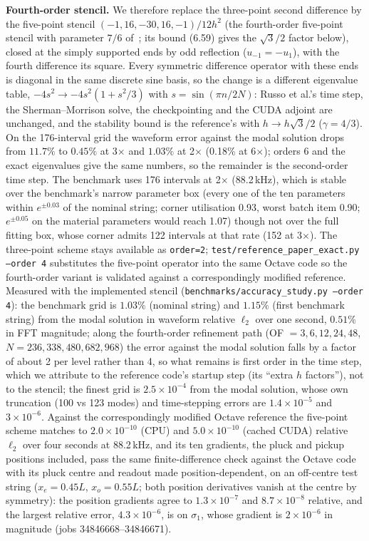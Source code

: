 \documentclass[a4paper,10pt]{article}
\begin{document}
\textbf{Fourth-order stencil.} We therefore replace the three-point second difference by the five-point stencil $(-1,16,-30,16,-1)/12h^2$ (the fourth-order five-point stencil with parameter $7/6$ of\ \cite[Sec.~6.3.1]{bilbao2009}; its bound (6.59) gives the $\sqrt3/2$ factor below), closed at the simply supported ends by odd reflection ($u_{-1}=-u_1$), with the fourth difference its square. Every symmetric difference operator with these ends is diagonal in the same discrete sine basis, so the change is a different eigenvalue table, $-4s^2\to-4s^2(1+s^2/3)$ with $s=\sin(\pi n/2N)$: Russo et al.'s time step, the Sherman--Morrison solve, the checkpointing and the CUDA adjoint are unchanged, and the stability bound is the reference's with $h\to h\sqrt{3}/2$ ($\gamma=4/3$). On the 176-interval grid the waveform error against the modal solution drops from $11.7\%$ to $0.45\%$ at 3$\times$ and $1.03\%$ at 2$\times$ (0.18\% at 6$\times$); orders 6 and the exact eigenvalues give the same numbers, so the remainder is the second-order time step. The benchmark uses 176 intervals at 2$\times$ (88.2\,kHz), which is stable over the benchmark's narrow parameter box (every one of the ten parameters within $e^{\pm0.03}$ of the nominal string; corner utilisation 0.93, worst batch item 0.90; $e^{\pm0.05}$ on the material parameters would reach 1.07) though not over the full fitting box, whose corner admits 122 intervals at that rate (152 at 3$\times$). The three-point scheme stays available as \texttt{order=2}; \texttt{test/reference\_paper\_exact.py --order 4} substitutes the five-point operator into the same Octave code so the fourth-order variant is validated against a correspondingly modified reference.
Measured with the implemented stencil (\texttt{benchmarks/accuracy\_study.py --order 4}): the benchmark grid is $1.03\%$ (nominal string) and $1.15\%$ (first benchmark string) from the modal solution in waveform relative $\ell_2$ over one second, $0.51\%$ in FFT magnitude; along the fourth-order refinement path (OF $=3,6,12,24,48$, $N=236,338,480,682,968$) the error against the modal solution falls by a factor of about 2 per level rather than 4, so what remains is first order in the time step, which we attribute to the reference code's startup step (its ``extra $h$ factors''), not to the stencil; the finest grid is $2.5\times10^{-4}$ from the modal solution, whose own truncation (100 vs 123 modes) and time-stepping errors are $1.4\times10^{-5}$ and $3\times10^{-6}$. Against the correspondingly modified Octave reference the five-point scheme matches to $2.0\times10^{-10}$ (CPU) and $5.0\times10^{-10}$ (cached CUDA) relative $\ell_2$ over four seconds at 88.2\,kHz, and its ten gradients, the pluck and pickup positions included, pass the same finite-difference check against the Octave code with its pluck centre and readout made position-dependent, on an off-centre test string ($x_e=0.45L$, $x_o=0.55L$; both position derivatives vanish at the centre by symmetry): the position gradients agree to $1.3\times10^{-7}$ and $8.7\times10^{-8}$ relative, and the largest relative error, $4.3\times10^{-6}$, is on $\sigma_1$, whose gradient is $2\times10^{-6}$ in magnitude (jobs 34846668--34846671).
\end{document}
